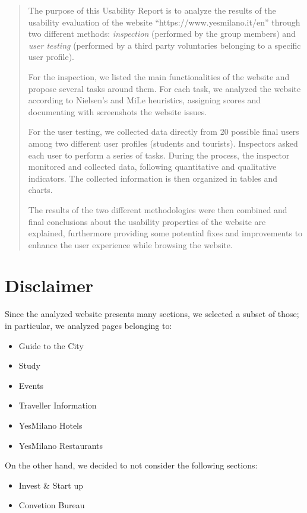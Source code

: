 
\begin{abstract}
    The purpose of this Usability Report is to analyze the results of the usability evaluation of the website ``https://www.yesmilano.it/en'' through two different methods: \emph{inspection} (performed by the group members) and \emph{user testing} (performed by a third party voluntaries belonging to a specific user profile).

    For the inspection, we listed the main functionalities of the website and propose several tasks around them. For each task, we analyzed the website according to Nielsen's and MiLe heuristics, assigning scores and documenting with screenshots the website issues.
    
    For the user testing, we collected data directly from 20 possible final users among two different user profiles (students and tourists). Inspectors asked each user to perform a series of tasks. During the process, the inspector monitored and collected data, following quantitative and qualitative indicators. The collected information is then organized in tables and charts.
    
    The results of the two different methodologies were then combined and final conclusions about the usability properties of the website are explained, furthermore providing some potential fixes and improvements to enhance the user experience while browsing the website.
\end{abstract}

\vspace*{5em}
\section*{Disclaimer}

Since the analyzed website presents many sections, we selected a subset of those; in particular, we analyzed pages belonging to:
\begin{itemize}
    \item Guide to the City
    \item Study
    \item Events
    \item Traveller Information
    \item YesMilano Hotels
    \item YesMilano Restaurants
\end{itemize}

On the other hand, we decided to not consider the following sections:
\begin{itemize}
    \item Invest \& Start up
    \item Convetion Bureau
\end{itemize}